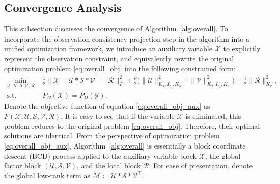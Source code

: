 \documentclass[a4paper,12pt]{article}
\numberwithin{equation}{section}
\numberwithin{algorithm}{section}
\theoremstyle{remark}
\theoremstyle{definition}
\begin{document}
\subsection{Convergence Analysis}
\label{sec:convergence}
This subsection discusses the convergence of Algorithm~\ref{alg:overall}. To incorporate the observation consistency projection step in the algorithm into a unified optimization framework, we introduce an auxiliary variable $\mathcal{X}$ to explicitly represent the observation constraint, and equivalently rewrite the original optimization problem \eqref{eq:overall_obj} into the following constrained form:
\begin{equation}\label{eq:overall_obj_aux}
	\begin{split}
		\min_{\mathcal{X},\mathcal{U},\mathcal{S},\mathcal{V},\mathcal{R}}\;& \frac{1}{2}\big\|\mathcal{X}-\mathcal{U}*\mathcal{S}*\mathcal{V}^{\top}-\mathcal{R}\big\|_{F}^{2}
		+\frac{\rho}{2}\Big(\|\mathcal{U}\|^{2}_{K_1,I_{r_g},K_3}+\|\mathcal{V}\|^{2}_{K_2,I_{r_g},K_3}\Big)
		+\frac{\gamma}{2}\|\mathcal{R}\|^{2}_{K_r},\\
		\mathrm{s.t.}\quad\; &P_{\Omega}(\mathcal{X})=P_{\Omega}(\mathcal{Y}).
	\end{split}
\end{equation}
Denote the objective function of equation \eqref{eq:overall_obj_aux} as $F(\mathcal{X},\mathcal{U},\mathcal{S},\mathcal{V},\mathcal{R})$. It is easy to see that if the variable $\mathcal{X}$ is eliminated, this problem reduces to the original problem \eqref{eq:overall_obj}. Therefore, their optimal solutions are identical. From the perspective of optimization problem \eqref{eq:overall_obj_aux}, Algorithm~\ref{alg:overall} is essentially a block coordinate descent (BCD) process applied to the auxiliary variable block $\mathcal{X}$, the global factor block $(\mathcal{U},\mathcal{S},\mathcal{V})$, and the local block $\mathcal{R}$. For ease of presentation, denote the global low-rank term as $\mathcal{M} \coloneqq \mathcal{U}*\mathcal{S}*\mathcal{V}^{\top}$.
\end{document}
